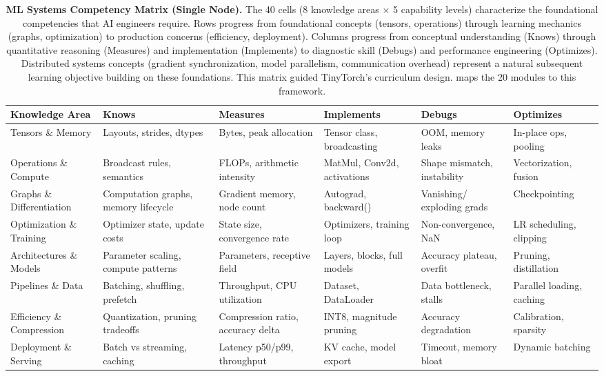 \documentclass[10pt,twocolumn]{article}
\begin{document}
\begin{table}[t]
\centering
\caption{\textbf{ML Systems Competency Matrix (Single Node).} The 40 cells (8 knowledge areas $\times$ 5 capability levels) characterize the foundational competencies that AI engineers require. Rows progress from foundational concepts (tensors, operations) through learning mechanics (graphs, optimization) to production concerns (efficiency, deployment). Columns progress from conceptual understanding (Knows) through quantitative reasoning (Measures) and implementation (Implements) to diagnostic skill (Debugs) and performance engineering (Optimizes). Distributed systems concepts (gradient synchronization, model parallelism, communication overhead) represent a natural subsequent learning objective building on these foundations. This matrix guided TinyTorch's curriculum design.  maps the 20 modules to this framework.}
\label{tab:competency-matrix}
\small
\renewcommand{\arraystretch}{1.4}
\setlength{\tabcolsep}{6pt}
\begin{tabularx}{0.98\textwidth}{@{}>{\raggedright\arraybackslash}p{2.4cm}>{\raggedright\arraybackslash}X>{\raggedright\arraybackslash}X>{\raggedright\arraybackslash}X>{\raggedright\arraybackslash}X>{\raggedright\arraybackslash}X@{}}
\toprule
\textbf{Knowledge Area} & \textbf{Knows} & \textbf{Measures} & \textbf{Implements} & \textbf{Debugs} & \textbf{Optimizes} \\
\midrule
Tensors \& Memory & Layouts, strides, dtypes & Bytes, peak allocation & Tensor class, broadcasting & OOM, memory leaks & In-place ops, pooling \\
\addlinespace[2pt]
Operations \& Compute & Broadcast rules, semantics & FLOPs, arithmetic intensity & MatMul, Conv2d, activations & Shape mismatch, instability & Vectorization, fusion \\
\addlinespace[2pt]
Graphs \& Differentiation & Computation graphs, memory lifecycle & Gradient memory, node count & Autograd, backward() & Vanishing/ exploding grads & Checkpointing \\
\addlinespace[2pt]
Optimization \& Training & Optimizer state, update costs & State size, convergence rate & Optimizers, training loop & Non-convergence, NaN & LR scheduling, clipping \\
\addlinespace[2pt]
Architectures \& Models & Parameter scaling, compute patterns & Parameters, receptive field & Layers, blocks, full models & Accuracy plateau, overfit & Pruning, distillation \\
\addlinespace[2pt]
Pipelines \& Data & Batching, shuffling, prefetch & Throughput, CPU utilization & Dataset, DataLoader & Data bottleneck, stalls & Parallel loading, caching \\
\addlinespace[2pt]
Efficiency \& Compression & Quantization, pruning tradeoffs & Compression ratio, accuracy delta & INT8, magnitude pruning & Accuracy degradation & Calibration, sparsity \\
\addlinespace[2pt]
Deployment \& Serving & Batch vs streaming, caching & Latency p50/p99, throughput & KV cache, model export & Timeout, memory bloat & Dynamic batching \\
\bottomrule
\end{tabularx}
\end{table}
\end{document}
